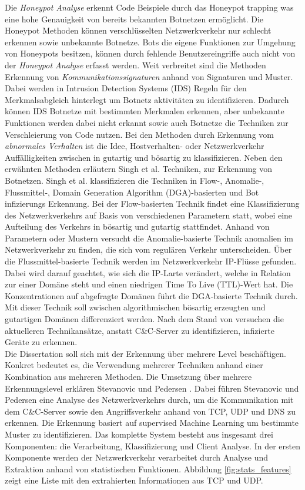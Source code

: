 Die \textit{Honeypot Analyse} erkennt Code Beispiele durch das Honeypot trapping was eine hohe Genauigkeit von bereits bekannten Botnetzen ermöglicht. Die Honeypot Methoden können
verschlüsselten Netzwerkverkehr nur schlecht erkennen sowie unbekannte Botnetze. Bots die eigene Funktionen zur Umgehung von Honeypots besitzen, können durch fehlende Benutzereingriffe
auch nicht von der \textit{Honeypot Analyse} erfasst werden. Weit verbreitet sind die Methoden Erkennung von \textit{Kommunikationssignaturen} anhand von Signaturen und Muster. Dabei 
werden in Intrusion Detection Systems (IDS) Regeln für den Merkmalsabgleich hinterlegt um Botnetz aktivitäten zu identifizieren. Dadurch können IDS Botnetze mit bestimmten Merkmalen 
erkennen, aber unbekannte Funktionen werden dabei nicht erkannt sowie auch Botnetze die Techniken zur Verschleierung von Code nutzen. Bei den Methoden durch Erkennung vom
\textit{abnormales Verhalten} ist die Idee, Hostverhalten- oder Netzwerkverkehr Auffälligkeiten zwischen in gutartig und bösartig zu klassifizieren. Neben den erwähnten Methoden 
erläutern Singh et al. \cite{DBLP:journals/compsec/SinghSK19} Techniken, zur Erkennung von Botnetzen. Singh et al. klassifizieren die Techniken in Flow-, Anomalie-, Flussmittel-, Domain Generation 
Algorithm (DGA)-basierten \cite{DBLP:journals/jksucis/ManasrahKF22} und Bot infizierungs Erkennung. Bei der Flow-basierten Technik findet eine Klassifizierung des Netzwerkverkehrs auf 
Basis von verschiedenen Parametern statt, wobei eine Aufteilung des Verkehrs in bösartig und gutartig stattfindet. Anhand von Parametern oder Mustern versucht die Anomalie-basierte Technik 
anomalien im Netzwerkverkehr zu finden, die sich vom regulären Verkehr unterscheiden. Über die Flussmittel-basierte Technik werden im Netzwerkverkehr IP-Flüsse gefunden. Dabei wird darauf 
geachtet, wie sich die IP-Larte verändert, welche in Relation zur einer Domäne steht und einen niedrigen Time To Live (TTL)-Wert hat. Die Konzentrationen auf abgefragte Domänen führt die 
DGA-basierte Technik durch. Mit dieser Technik soll zwischen algorithmischen bösartig erzeugten und gutartigen Domänen differenziert werden. Nach dem Stand von \cite{DBLP:journals/compsec/SinghSK19} 
versuchen die aktuelleren Technikansätze, anstatt C\&C-Server zu identifizieren, infizierte Geräte zu erkennen. \\ Die Dissertation soll sich mit der Erkennung über mehrere Level beschäftigen.
Konkret bedeutet es, die Verwendung mehrerer Techniken anhand einer Kombination aus mehreren Methoden. Die Umsetzung über mehrere Erkennungslevel erklären Stevanovic und Pedersen 
\cite{DBLP:journals/ijcysa/StevanovicP16}. Dabei führen Stevanovic und Pedersen eine Analyse des Netzwerkverkehrs durch, um die Kommunikation mit dem C\&C-Server sowie den Angriffsverkehr anhand von
TCP, UDP und DNS zu erkennen. Die Erkennung basiert auf supervised Machine Learning um bestimmte Muster zu identifizieren. Das komplette System besteht aus insgesamt drei Komponenten: die Verarbeitung,
Klassifizierung und Client Analyse. In der ersten Komponente werden der Netzwerkverkehr verarbeitet durch Analyse und Extraktion anhand von statistischen Funktionen. Abbildung \ref{fig:stats_features} 
zeigt eine Liste mit den extrahierten Informationen aus TCP und UDP. 

